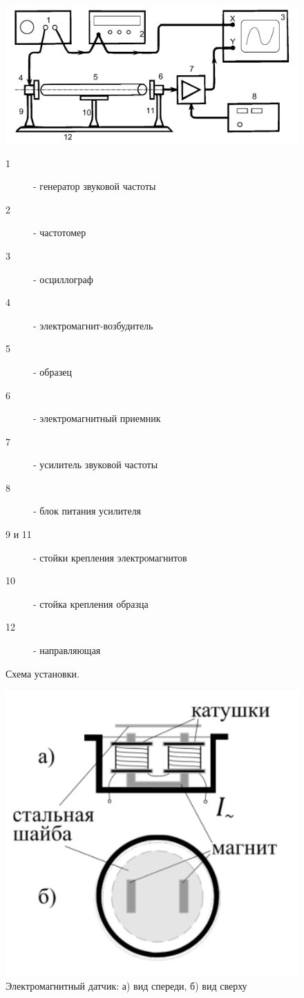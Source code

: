 \documentclass[a4paper,12pt]{article}
\numberwithin{equation}{section}
\begin{document}
\begin{figure} [H] \center
\includegraphics[scale=0.4]{data/pic3.png}
\caption{Схема установки.}
\begin{description}
  \item[1] - генератор звуковой частоты
  \item[2] - частотомер
  \item[3] - осциллограф
  \item[4] - электромагнит-возбудитель
  \item[5] - образец
  \item[6] - электромагнитный приемник
  \item[7] - усилитель звуковой частоты
  \item[8] - блок питания усилителя
  \item[9 и 11] - стойки крепления электромагнитов
  \item[10] - стойка крепления образца
  \item[12] - направляющая
\end{description}
\label{pic:3}
\end{figure}

\begin{figure} [H] \center
  \includegraphics[scale=0.4]{data/pic4.png}
  \caption[Электромагнитный датчик]{Электромагнитный датчик: а) вид спереди, б) вид сверху}
  \label{pic:4}
\end{figure}
\end{document}
